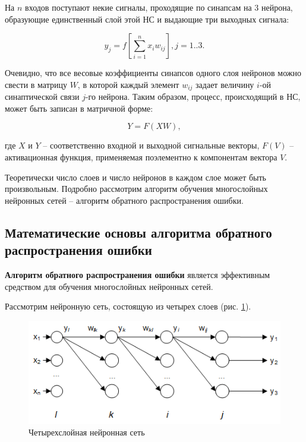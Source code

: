 На $n$ входов поступают некие сигналы, проходящие по синапсам на $3$ нейрона, образующие единственный слой этой НС и выдающие три выходных сигнала:

\begin{equation}
    y_j = f\left[\sum_{i=1}^{n}{x_i w_{i j}}\right], j = 1..3.
\end{equation}

Очевидно, что все весовые коэффициенты синапсов одного слоя нейронов можно свести в матрицу $W$, в которой каждый элемент $w_{i j}$ задает величину $i$-ой синаптической связи $j$-го нейрона. Таким образом, процесс, происходящий в НС, может быть записан в матричной форме:

\begin{equation}
    Y = F(X W),
\end{equation}

где $X$ и $Y$ – соответственно входной и выходной сигнальные векторы, $F(V)$ – активационная функция, применяемая поэлементно к компонентам вектора $V$.

Теоретически число слоев и число нейронов в каждом слое может быть произвольным. Подробно рассмотрим алгоритм обучения многослойных нейронных сетей – алгоритм обратного распространения ошибки.

\subsection{Математические основы алгоритма обратного распространения ошибки}

\textbf{Алгоритм обратного распространения ошибки} является эффективным средством для обучения многослойных нейронных сетей.

Рассмотрим нейронную сеть, состоящую из четырех слоев (рис. \ref{fig:neural_network_4x}).

\begin{figure}[H]
    \centering
    \includegraphics{images/chapter1/Четырехслойная нейронная сеть.png}
    \caption{Четырехслойная нейронная сеть}
    \label{fig:neural_network_4x}
\end{figure}

